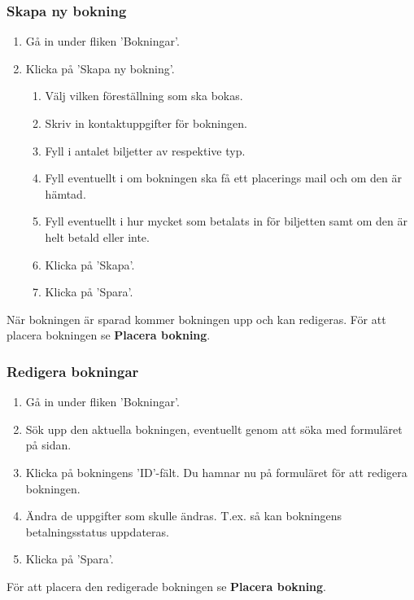 \documentclass[a4paper, twoside, 11pt, titlepage]{article}
\begin{document}
		\subsubsection{Skapa ny bokning}

		\begin{enumerate}
		\item Gå in under fliken 'Bokningar'.

		\item Klicka på 'Skapa ny bokning'.

		\begin{enumerate}
		\item Välj vilken föreställning som ska bokas.

		\item Skriv in kontaktuppgifter för bokningen.

		\item Fyll i antalet biljetter av respektive typ.

		\item Fyll eventuellt i om bokningen ska få ett placerings mail och om den är hämtad.

		\item Fyll eventuellt i hur mycket som betalats in för biljetten samt om den är helt betald eller inte.

		\item Klicka på 'Skapa'.

		\item Klicka på 'Spara'.
		\end{enumerate}
		\end{enumerate}

		När bokningen är sparad kommer bokningen upp och kan redigeras. För att placera bokningen se \textbf{Placera bokning}.

		\subsubsection{Redigera bokningar}

		\begin{enumerate}
		\item Gå in under fliken 'Bokningar'.

		\item Sök upp den aktuella bokningen, eventuellt genom att söka med formuläret på sidan.

		\item Klicka på bokningens 'ID'-fält. Du hamnar nu på formuläret för att redigera bokningen.

		\item Ändra de uppgifter som skulle ändras. T.ex. så kan bokningens betalningsstatus uppdateras.

		\item Klicka på 'Spara'.

		\end{enumerate}
		För att placera den redigerade bokningen se \textbf{Placera bokning}.
\end{document}
